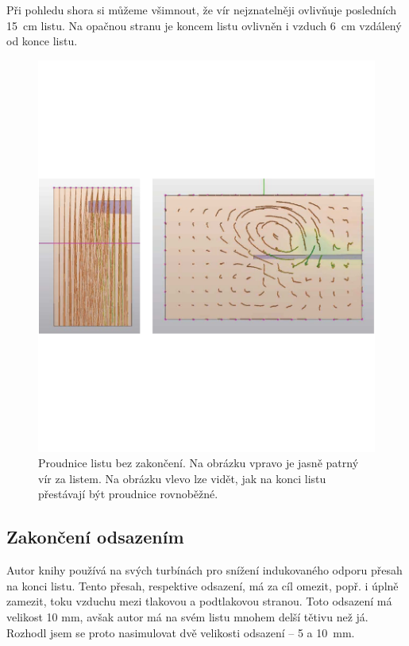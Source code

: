 Při pohledu shora si můžeme všimnout, že vír nejznatelněji ovlivňuje posledních 15~cm listu. Na opačnou stranu je koncem listu ovlivněn i vzduch 6~cm vzdálený od konce listu.

\begin{figure}[H]
	\centering
	\includegraphics[]{obrazky/simulace/simulace4p}
	\caption{Proudnice listu bez zakončení. Na obrázku vpravo je jasně patrný vír za listem. Na obrázku vlevo lze vidět, jak na konci listu přestávají být proudnice rovnoběžné.}
	\label{sim:4}
\end{figure}

\subsection{Zakončení odsazením}
Autor knihy \cite{Crome:Technika} používá na svých turbínách pro snížení indukovaného odporu přesah na konci listu. Tento přesah, respektive odsazení, má za cíl omezit, popř. i úplně zamezit, toku vzduchu mezi tlakovou a podtlakovou stranou. Toto odsazení má velikost 10 mm, avšak autor má na svém listu mnohem delší tětivu než já. Rozhodl jsem se proto nasimulovat dvě velikosti odsazení – 5 a 10~mm.

